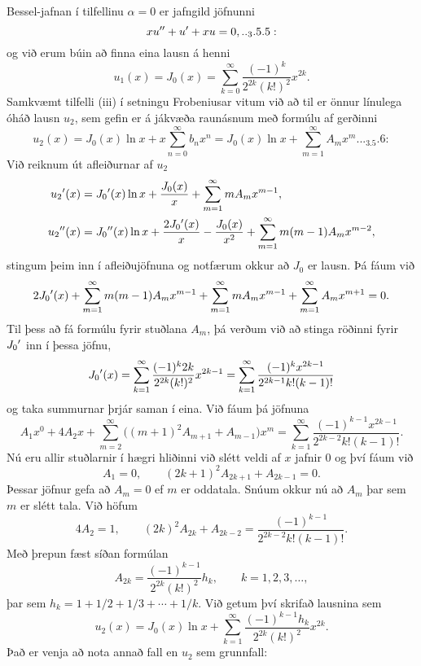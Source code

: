 Bessel-jafnan í tilfellinu ${\alpha}=0$ er jafngild jöfnunni
\begin{equation*}
xu\ddash+u\dash+xu=0,


.. _3.5.5:

\end{equation*}
og við erum búin að finna eina lausn á henni
$$
u_1(x)=J_0(x)=\sum\limits_{k=0}^{\infty}
\dfrac{(-1)^k}{2^{2k}(k!)^2}x^{2k}.
$$
Samkvæmt tilfelli (iii) í setningu Frobeniusar vitum við að
til er önnur línulega óháð lausn $u_2$, sem gefin er á jákvæða raunásnum
með formúlu af gerðinni
\begin{equation*}
u_2(x)=J_0(x)\ln x+x\sum\limits_{n=0}^{\infty} b_nx^n
=J_0(x)\ln x+\sum\limits_{m=1}^{\infty} A_mx^m.


.. _3.5.6:

\end{equation*}
Við reiknum út afleiðurnar af $u_2$ 
\begin{align*}
u_2{\sp{\prime}}(x)&=J_0{\sp{\prime}}(x)\ln x +\dfrac{J_0(x)}x+
\sum\limits_{m=1}^{\infty} mA_mx^{m-1},\\
u_2{\sp{\prime\prime}}(x)&= J_0{\sp{\prime\prime}}(x)\ln x+\dfrac{2J_0{\sp{\prime}}(x)}x-\dfrac{J_0(x)}{x^2}
+\sum\limits_{m=1}^{\infty} m(m-1)A_mx^{m-2},
\end{align*}
stingum þeim inn í afleiðujöfnuna  og notfærum okkur að $J_0$
er lausn.  Þá fáum við
$$
2J_0{\sp{\prime}}(x)+\sum\limits_{m=1}^{\infty} m(m-1)A_mx^{m-1}
+\sum\limits_{m=1}^{\infty} mA_mx^{m-1}
+\sum\limits_{m=1}^{\infty} A_mx^{m+1}=0.
$$
Til þess að fá formúlu fyrir stuðlana $A_m$, þá verðum við að stinga
röðinni fyrir $J_0{\sp{\prime}}$ inn í þessa jöfnu,
$$
J_0{\sp{\prime}}(x)=\sum \limits_{k=1}^{\infty}
\dfrac{(-1)^k2k}{2^{2k}(k!)^2}x^{2k-1}
=\sum \limits_{k=1}^{\infty}
\dfrac{(-1)^kx^{2k-1}}{2^{2k-1}k!(k-1)!}
$$
og taka summurnar þrjár saman í eina.  Við fáum þá jöfnuna 
$$
A_1x^0+4A_2x+\sum\limits_{m=2}^{\infty} 
\big((m+1)^2A_{m+1}+A_{m-1}\big)x^m
=\sum \limits_{k=1}^{\infty}
\dfrac{(-1)^{k-1}x^{2k-1}}{2^{2k-2}k!(k-1)!}.
$$
Nú eru allir stuðlarnir í hægri hliðinni við slétt veldi af $x$ 
 jafnir $0$ og því fáum við
$$
A_1=0, \qquad   (2k+1)^2A_{2k+1}+A_{2k-1}=0.
$$
Þessar jöfnur gefa að $A_m=0$ ef $m$ er oddatala.  Snúum okkur nú  að $A_m$
þar sem $m$ er slétt tala.  Við höfum
$$
4A_2=1, \qquad (2k)^2A_{2k}+A_{2k-2}=
\dfrac{(-1)^{k-1}}{2^{2k-2}k!(k-1)!}.
$$
Með þrepun fæst síðan formúlan
$$
A_{2k}=\dfrac{(-1)^{k-1}}{2^{2k}(k!)^2} h_k, \qquad k=1,2,3,\dots,
$$
þar sem $h_k=1+1/2+1/3+\cdots+1/k$.
Við getum því skrifað lausnina  sem
$$
u_2(x)= J_0(x)\ln x+
\sum\limits_{k=1}^{\infty}
\dfrac{(-1)^{k-1}h_k}{2^{2k}(k!)^2} x^{2k}.
$$
Það er venja að nota annað fall en $u_2$ sem grunnfall:


